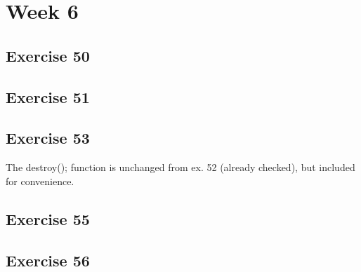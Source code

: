 \documentclass[a4paper]{article}
\let\stdsection\section
\renewcommand\section{\newpage\stdsection}
\begin{document}
\section*{Week 6}

\subsection*{Exercise 50}

\newpage
\subsection*{Exercise 51}


\newpage
\subsection*{Exercise 53}






The destroy(); function is unchanged from ex. 52 (already checked), but included for convenience.





\newpage
\subsection*{Exercise 55}











\newpage
\subsection*{Exercise 56}

\end{document}

